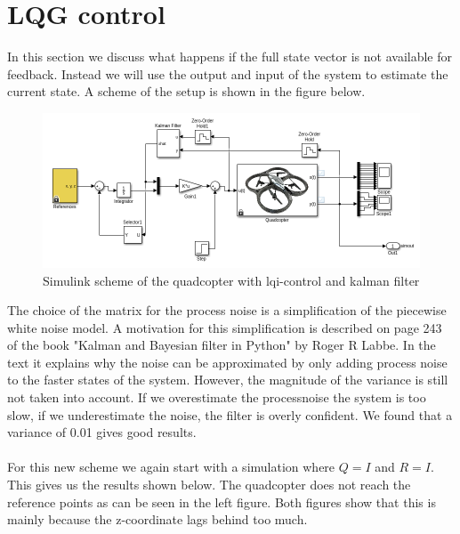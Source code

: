 \documentclass[]{article}
\begin{document}
\section{LQG control}
In this section we discuss what happens if the full state vector is not available for feedback. Instead we will use the output and input of the system to estimate the current state. A scheme of the setup is shown in the figure below. 

\begin{figure}[H]
\centering
\includegraphics[width=.9\textwidth]{kalscheme.png}
\caption{Simulink scheme of the quadcopter with lqi-control and kalman filter}
\end{figure}

The choice of the matrix for the process noise is a simplification of the piecewise white noise model. A motivation for this simplification is described on page 243 of the book "Kalman and Bayesian filter in Python" by Roger R Labbe. In the text it explains why the noise can be approximated by only adding process noise to the faster states of the system. However, the magnitude of the variance is still not taken into account. If we overestimate the processnoise the system is too slow, if we underestimate the noise, the filter is overly confident. We found that a variance of 0.01 gives good results. 
\\\\
For this new scheme we again start with a simulation where $Q=I$ and $R=I$. This gives us the results shown below. The quadcopter does not reach the reference points as can be seen in the left figure. Both figures show that this is mainly because the z-coordinate lags behind too much.
\end{document}
